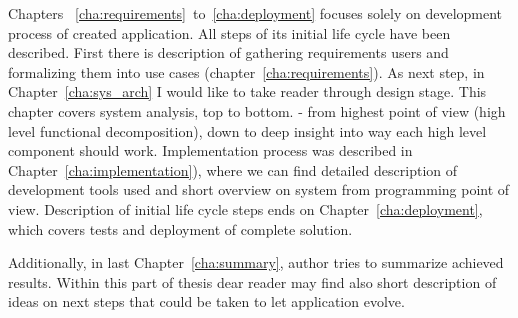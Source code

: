 Chapters ~\ref{cha:requirements}~to~\ref{cha:deployment} focuses solely on development process of created application. All steps of its initial life cycle have been described. First there is description of gathering requirements users and formalizing them into use cases (chapter~\ref{cha:requirements}). As next step, in Chapter~\ref{cha:sys_arch} I would like to take reader through design stage. This chapter covers system analysis, top to bottom. - from highest point of view (high level functional decomposition), down to deep insight into way each high level component should work. Implementation process was described in Chapter~\ref{cha:implementation}), where we can find detailed description of development tools used and short overview on system from programming point of view. Description of initial life cycle steps ends on Chapter~\ref{cha:deployment}, which covers tests and deployment of complete solution.

Additionally, in last Chapter~\ref{cha:summary}, author tries to summarize achieved results. Within this part of thesis dear reader may find also short description of ideas on next steps that could be taken to let application evolve.


